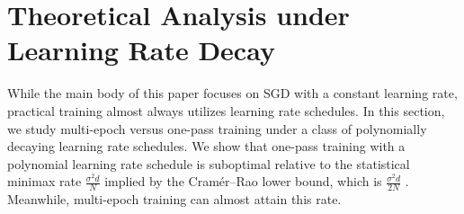 \section{Theoretical Analysis under Learning Rate Decay} \label{app:discussion}
\newcommand{\Vol}{\mathrm{Vol}}


While the main body of this paper focuses on SGD with a constant learning rate, practical training almost always utilizes learning rate schedules. 
In this section, we study multi-epoch versus one-pass training under a class of polynomially decaying learning rate schedules.
We show that one-pass training with a polynomial learning rate schedule is suboptimal relative to the statistical minimax rate $\frac{\sigma^2 d}{N}$ implied by the Cramér--Rao lower bound, which is $\frac{\sigma^2d}{2N}$ \citep{jain2017markov}. Meanwhile, multi-epoch training can almost attain this rate.



